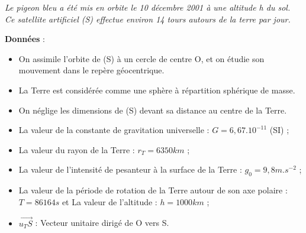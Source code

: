 \documentclass[12pt]{article}
\begin{document}
\emph{Le pigeon bleu a été mis en orbite le 10 décembre 2001 à une altitude h du sol. \\Ce
satellite artificiel (S) effectue environ 14 tours autours de la terre par jour. }

\textbf{Données} : 

\begin{itemize}
	\item On assimile l’orbite de (S) à un cercle de centre O, et on étudie son mouvement
dans le repère géocentrique.
\item La Terre est considérée comme une sphère à répartition sphérique de masse.
\item  On néglige les dimensions de (S) devant sa distance au centre de la Terre.

\item La valeur de la constante de gravitation universelle : $G = 6,67.10^{-11}$ (SI) ;
\item  La valeur du rayon de la Terre : $r_T = 6350 km$ ;
\item  La valeur de l’intensité de pesanteur à la surface
	de la Terre : $g_0 = 9,8 m.s^{-2}$ ;
\item La valeur de la période de rotation de la Terre
autour de son axe polaire : $T = 86164 s$ et La valeur de l’altitude : $h = 1000 km$ ;
\item $\vec{u_TS}$ : Vecteur unitaire dirigé de O vers S.

\end{itemize}
\end{document}
